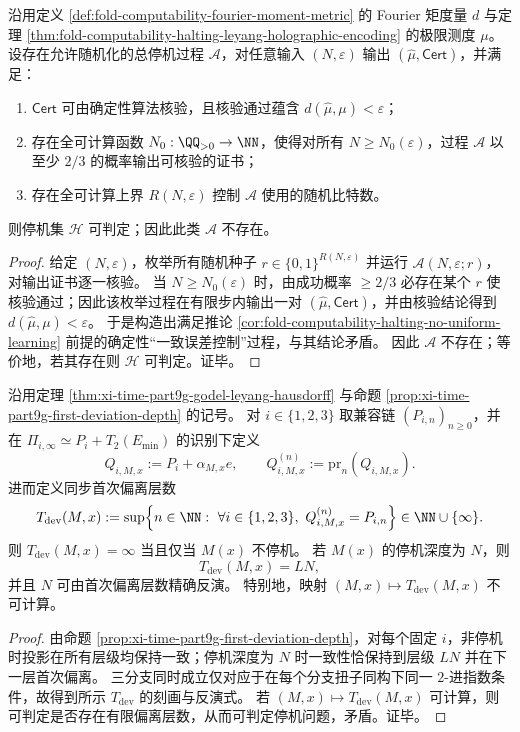 \begin{theorem}[带可核验证书的随机化统一误差控制学习仍推出停机可判定]\label{thm:conclusion-certified-randomized-uniform-learning-implies-decidable-halting}
沿用定义 \ref{def:fold-computability-fourier-moment-metric} 的 Fourier 矩度量 \(d\) 与定理 \ref{thm:fold-computability-halting-leyang-holographic-encoding} 的极限测度 \(\mu\)。
设存在允许随机化的总停机过程 \(\mathcal A\)，对任意输入 \((N,\varepsilon)\) 输出 \((\widehat\mu,\mathsf{Cert})\)，并满足：
\begin{enumerate}
  \item \(\mathsf{Cert}\) 可由确定性算法核验，且核验通过蕴含 \(d(\widehat\mu,\mu)<\varepsilon\)；
  \item 存在全可计算函数 \(N_0:\QQ_{>0}\to\NN\)，使得对所有 \(N\ge N_0(\varepsilon)\)，过程 \(\mathcal A\) 以至少 \(2/3\) 的概率输出可核验的证书；
  \item 存在全可计算上界 \(R(N,\varepsilon)\) 控制 \(\mathcal A\) 使用的随机比特数。
\end{enumerate}
则停机集 \(\mathcal H\) 可判定；因此此类 \(\mathcal A\) 不存在。
\end{theorem}
\begin{proof}
给定 \((N,\varepsilon)\)，枚举所有随机种子 \(r\in\{0,1\}^{R(N,\varepsilon)}\) 并运行 \(\mathcal A(N,\varepsilon;r)\)，对输出证书逐一核验。
当 \(N\ge N_0(\varepsilon)\) 时，由成功概率 \(\ge 2/3\) 必存在某个 \(r\) 使核验通过；因此该枚举过程在有限步内输出一对 \((\widehat\mu,\mathsf{Cert})\)，并由核验结论得到 \(d(\widehat\mu,\mu)<\varepsilon\)。
于是构造出满足推论 \ref{cor:fold-computability-halting-no-uniform-learning} 前提的确定性“一致误差控制”过程，与其结论矛盾。
因此 \(\mathcal A\) 不存在；等价地，若其存在则 \(\mathcal H\) 可判定。证毕。
\end{proof}

\begin{proposition}[\(2\)-进扭子链的首次偏离层数等价于停机深度]\label{prop:conclusion-2adic-first-deviation-time-halting-depth}
沿用定理 \ref{thm:xi-time-part9g-godel-leyang-hausdorff} 与命题 \ref{prop:xi-time-part9g-first-deviation-depth} 的记号。
对 \(i\in\{1,2,3\}\) 取兼容链 \((P_{i,n})_{n\ge 0}\)，并在 \(\Pi_{i,\infty}\simeq P_i+T_2(E_{\min})\) 的识别下定义
\[
Q_{i,M,x}:=P_i+\alpha_{M,x}e,\qquad
Q_{i,M,x}^{(n)}:=\mathrm{pr}_n(Q_{i,M,x}).
\]
进而定义同步首次偏离层数
\[
T_{\mathrm{dev}}(M,x):=\sup\Bigl\{n\in\NN:\ \forall i\in\{1,2,3\},\ Q_{i,M,x}^{(n)}=P_{i,n}\Bigr\}\in\NN\cup\{\infty\}.
\]
则 \(T_{\mathrm{dev}}(M,x)=\infty\) 当且仅当 \(M(x)\) 不停机。
若 \(M(x)\) 的停机深度为 \(N\)，则
\[
T_{\mathrm{dev}}(M,x)=LN,
\]
并且 \(N\) 可由首次偏离层数精确反演。
特别地，映射 \((M,x)\mapsto T_{\mathrm{dev}}(M,x)\) 不可计算。
\end{proposition}
\begin{proof}
由命题 \ref{prop:xi-time-part9g-first-deviation-depth}，对每个固定 \(i\)，非停机时投影在所有层级均保持一致；停机深度为 \(N\) 时一致性恰保持到层级 \(LN\) 并在下一层首次偏离。
三分支同时成立仅对应于在每个分支扭子同构下同一 \(2\)-进指数条件，故得到所示 \(T_{\mathrm{dev}}\) 的刻画与反演式。
若 \((M,x)\mapsto T_{\mathrm{dev}}(M,x)\) 可计算，则可判定是否存在有限偏离层数，从而可判定停机问题，矛盾。证毕。
\end{proof}

